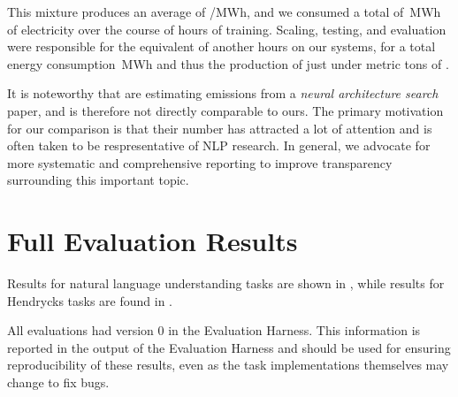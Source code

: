 \documentclass[11pt]{article}
\begin{document}
This mixture produces an average of  /MWh, and we consumed a total of \,MWh of electricity over the course of  hours of training. Scaling, testing, and evaluation were responsible for the equivalent of another  hours on our systems, for a total energy consumption \,MWh and thus the production of just under  metric tons of .

It is noteworthy that \citet{strubell2019energy} are estimating emissions from a \textit{neural architecture search} paper, and is therefore not directly comparable to ours. The primary motivation for our comparison is that their number has attracted a lot of attention and is often taken to be respresentative of NLP research. In general, we advocate for more systematic and comprehensive reporting to improve transparency surrounding this important topic.


\section{Full Evaluation Results}\label{app:downstream}

Results for natural language understanding tasks are shown in , while results for Hendrycks tasks are found in .

All evaluations had version 0 in the Evaluation Harness. This information is reported in the output of the Evaluation Harness and should be used for ensuring reproducibility of these results, even as the task implementations themselves may change to fix bugs.

\clearpage
\end{document}
